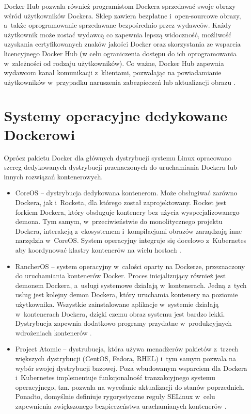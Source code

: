Docker Hub pozwala również programistom Dockera sprzedawać swoje obrazy wśród użytkowników Dockera. Sklep zawiera bezpłatne i~open-sourcowe obrazy, a~także oprogramowanie sprzedawane bezpośrednio przez wydawców. Każdy użytkownik może zostać wydawcą co zapewnia lepszą widoczność, możliwość uzyskania certyfikowanych znaków jakości Docker oraz skorzystania ze wsparcia licencyjnego Docker Hub (w celu ograniczenia dostępu do ich oprogramowania w~zależności od rodzaju użytkowników). Co ważne, Docker Hub zapewnia wydawcom kanał komunikacji z~klientami, pozwalając na powiadamianie użytkowników w~przypadku naruszenia zabezpieczeń lub aktualizacji obrazu \cite{DockerTechnologyPartnerProgramGuide}.

\section{Systemy operacyjne dedykowane Dockerowi}

Oprócz pakietu Docker dla głównych dystrybucji systemu Linux opracowano szereg dedykowanych dystrybucji przenaczonych do uruchamiania Dockera lub innych rozwiązań kontenerowych.

\begin{itemize}
    \item CoreOS -- dystrybucja dedykowana kontenerom. Może obsługiwać zarówno Dockera, jak i~Rocketa, dla którego został zaprojektowany. Rocket jest forkiem Dockera, który obsługuje kontenery bez użycia wyspecjalizowanego demona. Tym samym, w~przeciwieństwie do monolitycznego projektu Dockera, interakcją z~ekosystemem i~kompilacjami obrazów zarządzają inne narzędzia w~CoreOS. System operacyjny integruje się docelowo z~Kubernetes aby koordynować klastry kontenerów na wielu hostach \cite{PurrierWhatIsRocket}.
    \item RancherOS -- system operacyjny w~całości oparty na Dockerze, przeznaczony do uruchamiania kontenerów Docker. Proces inicjalizujący również jest demonem Dockera, a~usługi systemowe działają w~kontenerach. Jedną z~tych usług jest kolejny demon Dockera, który uruchamia kontenery na poziomie użytkownika. Wszystkie zainstalowane aplikacje w~systemie działają w~kontenerach Dockera, dzięki czemu obraz systemu jest bardzo lekki. Dystrybucja zapewnia dodatkowo programy przydatne w~produkcyjnych wdrożeniach kontenerów \cite{RoslandContainerOSComparison}.
    \item Project Atomic -- dystrubucja, która używa menadżerów pakietów z~trzech większych dystrybucji (CentOS, Fedora, RHEL) i~tym samym pozwala na wybór swojej dystrybucji bazowej. Poza wbudowanym wsparciem dla Dockera i~Kubernetes implementuje funkcjonalność tranzakcyjnego systemu operacyjnego, tzn. pozwala na wycofanie aktualizacji do stanów poprzednich. Ponadto, domyślnie definiuje rygorystyczne reguły SELinux w~celu zapewnienia zwiększonego bezpieczeństwa urachamianych kontenerów \cite{RoslandContainerOSComparison}.
\end{itemize}

